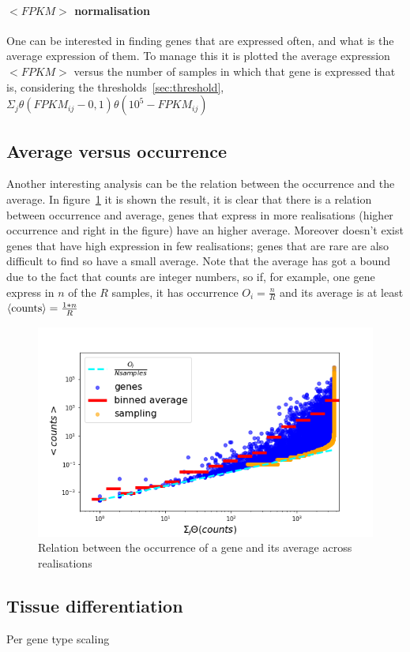 \paragraph{$<FPKM>$ normalisation}
One can be interested in finding genes that are expressed often, and what is the 
average expression of them.
To manage this it is plotted the average expression $<FPKM>$ versus the number 
of samples in which that gene is expressed that is, considering the thresholds~\ref{sec:threshold}, 
$\Sigma_j\theta (FPKM_{ij}-0,1)\theta (10^5-FPKM_{ij})$

\subsection{Average versus occurrence}
Another interesting analysis can be the relation between the occurrence and the average. In figure~\ref{fig:scalelaws/gtex/meanDiff_binned_sampling} it is shown the result, it is clear that there is a relation between occurrence and average, genes that express in more realisations (higher occurrence and right in the figure) have an higher average. Moreover doesn't exist genes that have high expression in few realisations; genes that are rare are also difficult to find so have a small average. Note that the average has got a bound due to the fact that counts are integer numbers, so if, for example, one gene express in $n$ of the $R$ samples, it has occurrence $O_i=\frac{n}{R}$ and its average is at least $\left\langle \mathrm{counts}\right\rangle=\frac{1*n}{R}$
\begin{figure}[htb!]
    \centering
    \includegraphics[width=0.9\linewidth]{pictures/scalelaws/gtex/meanDiff_binned_sampling.png}
    \caption{Relation between the occurrence of a gene and its average across realisations}
    \label{fig:scalelaws/gtex/meanDiff_binned_sampling}
\end{figure}

\subsection{Tissue differentiation}
Per gene type scaling



